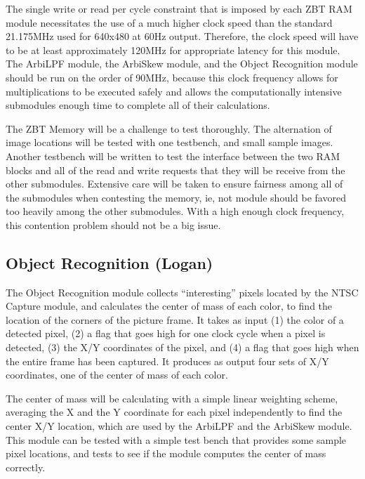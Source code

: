 \documentclass[10pt]{article}
\begin{document}
The single write or read per cycle constraint that is imposed by each ZBT RAM module necessitates the use of a much higher clock speed than the standard 21.175MHz used for 640x480 at 60Hz output. Therefore, the clock speed will have to be at least approximately 120MHz for appropriate latency for this module. The ArbiLPF module, the ArbiSkew module, and the Object Recognition module should be run on the order of 90MHz, because this clock frequency allows for multiplications to be executed safely and allows the computationally intensive submodules enough time to complete all of their calculations.

The ZBT Memory will be a challenge to test thoroughly. The alternation of image locations will be tested with one testbench, and small sample images. Another testbench will be written to test the interface between the two RAM blocks and all of the read and write requests that they will be receive from the other submodules. Extensive care will be taken to ensure fairness among all of the submodules when contesting the memory, ie, not module should be favored too heavily among the other submodules. With a high enough clock frequency, this contention problem should not be a big issue.

\subsection{Object Recognition (Logan)}
The Object Recognition module collects ``interesting'' pixels located by the NTSC Capture module, and calculates the center of mass of each color, to find the location of the corners of the picture frame. It takes as input (1) the color of a detected pixel, (2) a flag that goes high for one clock cycle when a pixel is detected, (3) the X/Y coordinates of the pixel, and (4) a flag that goes high when the entire frame has been captured. It produces as output four sets of X/Y coordinates, one of the center of mass of each color.

The center of mass will be calculating with a simple linear weighting scheme, averaging the X and the Y coordinate for each pixel independently to find the center X/Y location, which are used by the ArbiLPF and the ArbiSkew module. This module can be tested with a simple test bench that provides some sample pixel locations, and tests to see if the module computes the center of mass correctly.
\end{document}
